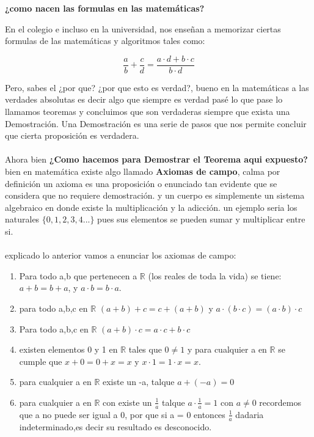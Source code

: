 \documentclass{article}
\begin{document}
\begin{center}
    \textbf{¿como nacen las formulas en las matemáticas?}
\end{center}
En el colegio e incluso en la universidad, nos enseñan a memorizar ciertas formulas de las matemáticas y algoritmos tales como:

    \begin{equation*}
        \frac{a}{b}+\frac{c}{d}=\frac{a \cdot d + b \cdot c}{b \cdot d}
    \end{equation*}

Pero, sabes el ¿por que? ¿por que esto es verdad?, bueno en la matemáticas a las verdades absolutas
es decir algo que siempre es verdad pasé lo que pase lo llamamos teoremas y concluimos que son verdaderas 
siempre que exista una Demostración. Una Demostración es una serie de pasos que nos permite concluir 
que cierta proposición es verdadera.
\\
\\ 
Ahora bien \textbf{¿Como hacemos para Demostrar el Teorema aqui expuesto?} bien en matemática existe 
algo llamado \textbf{Axiomas de campo}, calma por definición un axioma es una proposición o enunciado tan evidente que se considera que no requiere demostración.
y un cuerpo es simplemente un  sistema algebraico en donde existe la multiplicación y la adicción.
un ejemplo seria los naturales $\{0,1,2,3,4...\}$ pues sus elementos se pueden sumar y multiplicar entre si.
\\
\\ 
explicado lo anterior vamos a enunciar los axiomas de campo:
\begin{enumerate}
    \item Para todo a,b que pertenecen a $\mathbb R$ (los reales de toda la vida) se tiene: 
    $a + b = b + a$, y $a \cdot b = b \cdot a$.
    \item para todo a,b,c en $\mathbb R$ $(a+b)+c = c+(a+b)$ y $a \cdot (b \cdot c)= (a \cdot b) \cdot c$
    \item Para todo a,b,c en  $\mathbb R$ $(a + b) \cdot c = a \cdot c + b \cdot c $
    \item existen elementos 0 y 1 en $\mathbb{R}$ tales que $0 \not = 1$ y para cualquier a en $\mathbb R$ se cumple que 
    $x + 0 = 0 + x = x$ y $x \cdot 1 = 1 \cdot x = x.$
    \item para cualquier a en $\mathbb R$ existe un -a, talque $a+(-a)=0$
    \item para cualquier a en $\mathbb R$ con existe un $\frac{1}{a}$ talque $a \cdot \frac{1}{a} = 1$ con $ a \not = 0$ 
    recordemos que a no puede ser igual a 0, por que si a = 0 entonces $\frac{1}{a}$ dadaria indeterminado,es decir su resultado es desconocido.
\end{enumerate}
\end{document}
